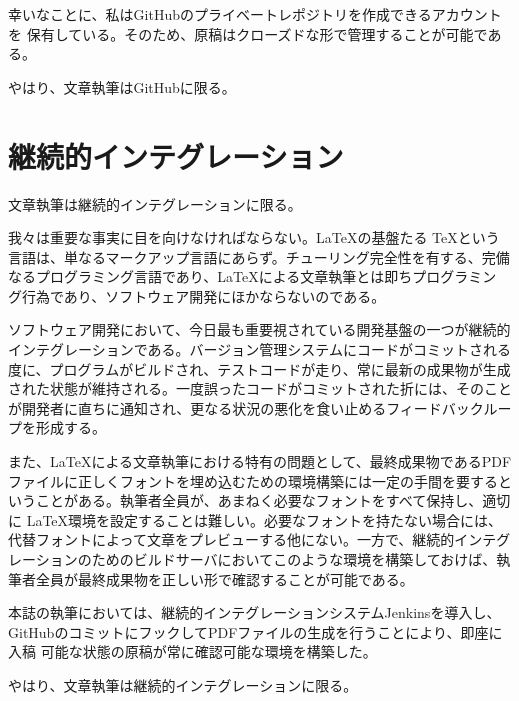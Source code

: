 幸いなことに、私はGitHubのプライベートレポジトリを作成できるアカウントを
保有している。そのため、原稿はクローズドな形で管理することが可能である。

やはり、文章執筆はGitHubに限る。

\section{継続的インテグレーション}

文章執筆は継続的インテグレーションに限る。

我々は重要な事実に目を向けなければならない。\LaTeX の基盤たる \TeX という
言語は、単なるマークアップ言語にあらず。チューリング完全性を有する、完備
なるプログラミング言語であり、\LaTeX による文章執筆とは即ちプログラミン
グ行為であり、ソフトウェア開発にほかならないのである。

ソフトウェア開発において、今日最も重要視されている開発基盤の一つが継続的
インテグレーションである。バージョン管理システムにコードがコミットされる
度に、プログラムがビルドされ、テストコードが走り、常に最新の成果物が生成
された状態が維持される。一度誤ったコードがコミットされた折には、そのこと
が開発者に直ちに通知され、更なる状況の悪化を食い止めるフィードバックルー
プを形成する。

また、\LaTeX による文章執筆における特有の問題として、最終成果物であるPDF
ファイルに正しくフォントを埋め込むための環境構築には一定の手間を要すると
いうことがある。執筆者全員が、あまねく必要なフォントをすべて保持し、適切
に \LaTeX 環境を設定することは難しい。必要なフォントを持たない場合には、
代替フォントによって文章をプレビューする他にない。一方で、継続的インテグ
レーションのためのビルドサーバにおいてこのような環境を構築しておけば、執
筆者全員が最終成果物を正しい形で確認することが可能である。

本誌の執筆においては、継続的インテグレーションシステムJenkinsを導入し、
GitHubのコミットにフックしてPDFファイルの生成を行うことにより、即座に入稿
可能な状態の原稿が常に確認可能な環境を構築した。

やはり、文章執筆は継続的インテグレーションに限る。